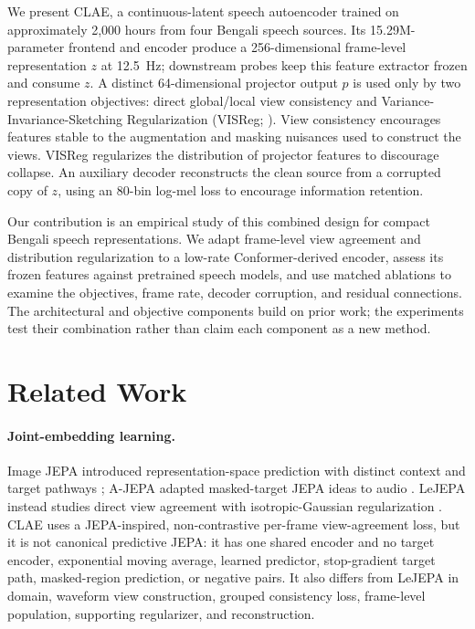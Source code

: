 \documentclass[11pt,a4paper]{article}
\begin{document}
We present CLAE, a continuous-latent speech autoencoder trained on approximately 2,000 hours from four Bengali speech sources. Its 15.29M-parameter frontend and encoder produce a 256-dimensional frame-level representation $z$ at 12.5~Hz; downstream probes keep this feature extractor frozen and consume $z$. A distinct 64-dimensional projector output $p$ is used only by two representation objectives: direct global/local view consistency and Variance-Invariance-Sketching Regularization (VISReg; \citealp{wu2026visreg}). View consistency encourages features stable to the augmentation and masking nuisances used to construct the views. VISReg regularizes the distribution of projector features to discourage collapse. An auxiliary decoder reconstructs the clean source from a corrupted copy of $z$, using an 80-bin log-mel loss to encourage information retention.

Our contribution is an empirical study of this combined design for compact Bengali speech representations. We adapt frame-level view agreement and distribution regularization to a low-rate Conformer-derived encoder, assess its frozen features against pretrained speech models, and use matched ablations to examine the objectives, frame rate, decoder corruption, and residual connections. The architectural and objective components build on prior work; the experiments test their combination rather than claim each component as a new method.

\section{Related Work}

\paragraph{Joint-embedding learning.}
Image JEPA introduced representation-space prediction with distinct context and target pathways \citep{assran2023ijepa}; A-JEPA adapted masked-target JEPA ideas to audio \citep{fei2023ajepa}. LeJEPA instead studies direct view agreement with isotropic-Gaussian regularization \citep{balestriero2025lejepa}. CLAE uses a JEPA-inspired, non-contrastive per-frame view-agreement loss, but it is not canonical predictive JEPA: it has one shared encoder and no target encoder, exponential moving average, learned predictor, stop-gradient target path, masked-region prediction, or negative pairs. It also differs from LeJEPA in domain, waveform view construction, grouped consistency loss, frame-level population, supporting regularizer, and reconstruction.
\end{document}
